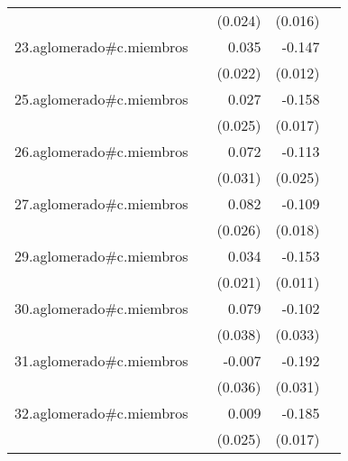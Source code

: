 {\begin{longtable}{l*{4}{D{.}{.}{-1}}}
            &                     &     (0.024)         &     (0.016)         &                     \\
\addlinespace
23.aglomerado#c.miembros&                     &       0.035         &      -0.147\sym{***}&                     \\
            &                     &     (0.022)         &     (0.012)         &                     \\
\addlinespace
25.aglomerado#c.miembros&                     &       0.027         &      -0.158\sym{***}&                     \\
            &                     &     (0.025)         &     (0.017)         &                     \\
\addlinespace
26.aglomerado#c.miembros&                     &       0.072\sym{*}  &      -0.113\sym{***}&                     \\
            &                     &     (0.031)         &     (0.025)         &                     \\
\addlinespace
27.aglomerado#c.miembros&                     &       0.082\sym{**} &      -0.109\sym{***}&                     \\
            &                     &     (0.026)         &     (0.018)         &                     \\
\addlinespace
29.aglomerado#c.miembros&                     &       0.034         &      -0.153\sym{***}&                     \\
            &                     &     (0.021)         &     (0.011)         &                     \\
\addlinespace
30.aglomerado#c.miembros&                     &       0.079\sym{*}  &      -0.102\sym{**} &                     \\
            &                     &     (0.038)         &     (0.033)         &                     \\
\addlinespace
31.aglomerado#c.miembros&                     &      -0.007         &      -0.192\sym{***}&                     \\
            &                     &     (0.036)         &     (0.031)         &                     \\
\addlinespace
32.aglomerado#c.miembros&                     &       0.009         &      -0.185\sym{***}&                     \\
            &                     &     (0.025)         &     (0.017)         &                     \\

\end{longtable}}
